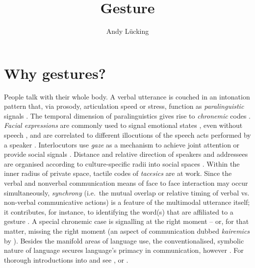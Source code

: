 \documentclass[output=paper]{langsci/langscibook}
\author{Andy Lücking\affiliation{Universit\'{e} de Paris, Goethe-Universität Frankfurt}}
\title{Gesture}
\begin{document}
\maketitle
\label{chap-gesture}

\avmoptions{}

\section{Why gestures?} 
\label{sec:why-gestures}

People talk with their whole body. 
%
A verbal utterance is couched in an intonation pattern that, via prosody, articulation speed or stress, function as \emph{paralinguistic}  signals \citep[e.g.][]{Birdwhistell:1970}. 
%
The temporal dimension of paralinguistics gives rise to \emph{chronemic} codes  \citep{Poyatos:1975,Bruneau:1980}. \emph{Facial expressions}  are commonly used to signal emotional states  \citep{Ekman:Friesen:1978}, even without speech \citep{Argyle:1975}, and are correlated to different illocutions of the speech acts performed by a speaker \citep{Domaneschi:Passarelli:Chiorri:2017}.
%
Interlocutors use \emph{gaze}  as a mechanism to achieve joint attention \citep{Argyle:Cook:1976} or provide social signals \citep{Kendon:1967}. 
%
Distance and relative direction of speakers and addressees are organised according to culture-specific radii into social spaces  \citep[\emph{proxemics},][]{Hall:1968}. 
%
Within the inner radius of private space, tactile codes of \emph{tacesics}  \citep{Kauffman:1971} are at work. 
%
Since the verbal and nonverbal communication means of face to face interaction  may occur simultaneously, \emph{synchrony}  (i.e.\ the mutual overlap or relative timing of verbal vs. non-verbal communicative actions) is a feature of the multimodal utterance itself; it contributes, for instance, to identifying the word(s) that are affiliated to a gesture \citep{Wiltshire:2007}. 
%
A special chronemic case is signalling at the right moment -- or, for that matter, missing the right moment (an aspect of communication dubbed \emph{kairemics}  by \citealp[]{Luecking:Pfeiffer:2012}).
%
Besides the manifold areas of language use, the conventionalised, symbolic nature of language secures language's primacy in communication, however \citep{de:Ruiter:2004}.
%
For thorough introductions into  and  see \citet{Noeth:1990}, \citet{Posner:Robering:Sebeok:1997:2004} or \citet{Mueller:Cienki:Fricke:Ladewig:McNeill:Tessendorf:2013:2014}.
\end{document}
